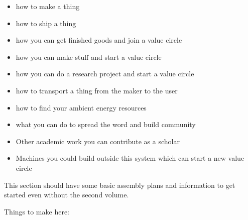 \begin{itemize}
\tightlist
\item
  how to make a thing
\item
  how to ship a thing
\item
  how you can get finished goods and join a value circle
\item
  how you can make stuff and start a value circle
\item
  how you can do a research project and start a value circle
\item
  how to transport a thing from the maker to the user
\item
  how to find your ambient energy resources
\item
  what you can do to spread the word and build community
\item
  Other academic work you can contribute as a scholar
\item
  Machines you could build outside this system which can start a new
  value circle
\end{itemize}

This section should have some basic assembly plans and information to
get started even without the second volume.

Things to make here:

